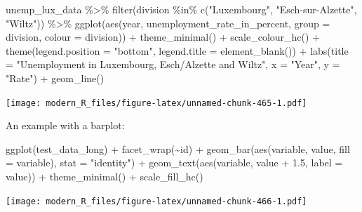\documentclass[
]{article}
\newenvironment{Shaded}{\begin{snugshade}}{\end{snugshade}}
\newcommand{\AttributeTok}[1]{\textcolor[rgb]{0.77,0.63,0.00}{#1}}
\newcommand{\FloatTok}[1]{\textcolor[rgb]{0.00,0.00,0.81}{#1}}
\newcommand{\FunctionTok}[1]{\textcolor[rgb]{0.00,0.00,0.00}{#1}}
\newcommand{\NormalTok}[1]{#1}
\newcommand{\SpecialCharTok}[1]{\textcolor[rgb]{0.00,0.00,0.00}{#1}}
\newcommand{\StringTok}[1]{\textcolor[rgb]{0.31,0.60,0.02}{#1}}
\begin{document}
\begin{Shaded}
\begin{Highlighting}[]
\NormalTok{unemp\_lux\_data }\SpecialCharTok{\%\textgreater{}\%}
  \FunctionTok{filter}\NormalTok{(division }\SpecialCharTok{\%in\%} \FunctionTok{c}\NormalTok{(}\StringTok{"Luxembourg"}\NormalTok{, }\StringTok{"Esch{-}sur{-}Alzette"}\NormalTok{, }\StringTok{"Wiltz"}\NormalTok{)) }\SpecialCharTok{\%\textgreater{}\%}
  \FunctionTok{ggplot}\NormalTok{(}\FunctionTok{aes}\NormalTok{(year, unemployment\_rate\_in\_percent, }\AttributeTok{group =}\NormalTok{ division, }\AttributeTok{colour =}\NormalTok{ division)) }\SpecialCharTok{+}
  \FunctionTok{theme\_minimal}\NormalTok{() }\SpecialCharTok{+}
  \FunctionTok{scale\_colour\_hc}\NormalTok{() }\SpecialCharTok{+}
  \FunctionTok{theme}\NormalTok{(}\AttributeTok{legend.position =} \StringTok{"bottom"}\NormalTok{, }\AttributeTok{legend.title =} \FunctionTok{element\_blank}\NormalTok{()) }\SpecialCharTok{+}
  \FunctionTok{labs}\NormalTok{(}\AttributeTok{title =} \StringTok{"Unemployment in Luxembourg, Esch/Alzette and Wiltz"}\NormalTok{, }\AttributeTok{x =} \StringTok{"Year"}\NormalTok{, }\AttributeTok{y =} \StringTok{"Rate"}\NormalTok{) }\SpecialCharTok{+}
  \FunctionTok{geom\_line}\NormalTok{()}
\end{Highlighting}
\end{Shaded}

\texttt{[image: modern\_R\_files/figure-latex/unnamed-chunk-465-1.pdf]}

An example with a barplot:

\begin{Shaded}
\begin{Highlighting}[]
\FunctionTok{ggplot}\NormalTok{(test\_data\_long) }\SpecialCharTok{+}
  \FunctionTok{facet\_wrap}\NormalTok{(}\SpecialCharTok{\textasciitilde{}}\NormalTok{id) }\SpecialCharTok{+}
  \FunctionTok{geom\_bar}\NormalTok{(}\FunctionTok{aes}\NormalTok{(variable, value, }\AttributeTok{fill =}\NormalTok{ variable), }\AttributeTok{stat =} \StringTok{"identity"}\NormalTok{) }\SpecialCharTok{+}
  \FunctionTok{geom\_text}\NormalTok{(}\FunctionTok{aes}\NormalTok{(variable, value }\SpecialCharTok{+} \FloatTok{1.5}\NormalTok{, }\AttributeTok{label =}\NormalTok{ value)) }\SpecialCharTok{+}
  \FunctionTok{theme\_minimal}\NormalTok{() }\SpecialCharTok{+}
  \FunctionTok{scale\_fill\_hc}\NormalTok{()}
\end{Highlighting}
\end{Shaded}

\texttt{[image: modern\_R\_files/figure-latex/unnamed-chunk-466-1.pdf]}
\end{document}
